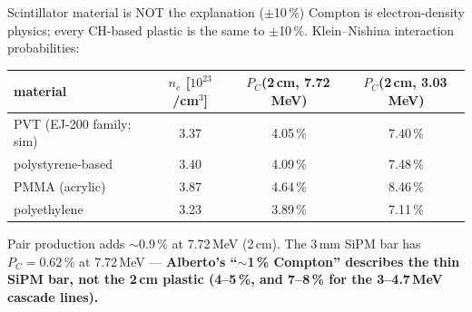 \documentclass[aspectratio=169,11pt]{beamer}
\begin{document}
\begin{frame}{Scintillator material is NOT the explanation ($\pm$10\,\%)}
  \small
  Compton is electron-density physics; every CH-based plastic is the same to
  $\pm$10\,\%. Klein--Nishina interaction probabilities:
  \medskip

  \centering
  \begin{tabular}{lccc}
    \toprule
    material & $n_e$ [$10^{23}$/cm$^3$] & $P_C$(2\,cm, 7.72\,MeV) & $P_C$(2\,cm, 3.03\,MeV) \\
    \midrule
    PVT (EJ-200 family; sim) & 3.37 & 4.05\,\% & 7.40\,\% \\
    polystyrene-based & 3.40 & 4.09\,\% & 7.48\,\% \\
    PMMA (acrylic) & 3.87 & 4.64\,\% & 8.46\,\% \\
    polyethylene & 3.23 & 3.89\,\% & 7.11\,\% \\
    \bottomrule
  \end{tabular}
  \medskip

  \raggedright
  Pair production adds $\sim$0.9\,\% at 7.72\,MeV (2\,cm). The 3\,mm SiPM bar
  has $P_C=0.62\,\%$ at 7.72\,MeV --- \textbf{Alberto's ``$\sim$1\,\%
  Compton'' describes the thin SiPM bar, not the 2\,cm plastic (4--5\,\%,
  and 7--8\,\% for the 3--4.7\,MeV cascade lines).}
\end{frame}
\end{document}
